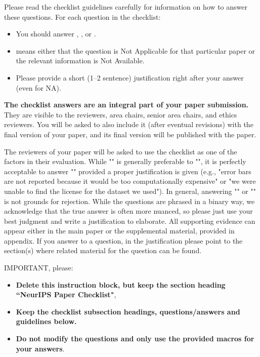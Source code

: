 \documentclass{article}
\begin{document}
Please read the checklist guidelines carefully for information on how to answer these questions. For each question in the checklist:
\begin{itemize}
    \item You should answer \answerYes{}, \answerNo{}, or \answerNA{}.
    \item \answerNA{} means either that the question is Not Applicable for that particular paper or the relevant information is Not Available.
    \item Please provide a short (1–2 sentence) justification right after your answer (even for NA). 
\end{itemize}

{\bf The checklist answers are an integral part of your paper submission.} They are visible to the reviewers, area chairs, senior area chairs, and ethics reviewers. You will be asked to also include it (after eventual revisions) with the final version of your paper, and its final version will be published with the paper.

The reviewers of your paper will be asked to use the checklist as one of the factors in their evaluation. While "\answerYes{}" is generally preferable to "\answerNo{}", it is perfectly acceptable to answer "\answerNo{}" provided a proper justification is given (e.g., "error bars are not reported because it would be too computationally expensive" or "we were unable to find the license for the dataset we used"). In general, answering "\answerNo{}" or "\answerNA{}" is not grounds for rejection. While the questions are phrased in a binary way, we acknowledge that the true answer is often more nuanced, so please just use your best judgment and write a justification to elaborate. All supporting evidence can appear either in the main paper or the supplemental material, provided in appendix. If you answer \answerYes{} to a question, in the justification please point to the section(s) where related material for the question can be found.

IMPORTANT, please:
\begin{itemize}
    \item {\bf Delete this instruction block, but keep the section heading ``NeurIPS Paper Checklist"},
    \item  {\bf Keep the checklist subsection headings, questions/answers and guidelines below.}
    \item {\bf Do not modify the questions and only use the provided macros for your answers}.
\end{itemize} 
 
\end{document}
